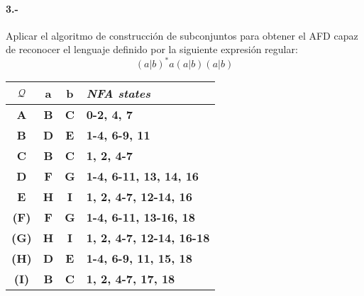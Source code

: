 \documentclass[11pt,a4paper,table,answers]{exam} %
\newcommand{\h}[1]{\ifprintanswers\textcolor{azul}{\bf#1}\else{\phantom{\bf#1}}\fi}
\newlength{\graphicheigth}
\newcommand{\myincludegraphicssol}[1]{%
    \sbox{\graphicbox}{%
        \begin{adjustbox}{max size={\textwidth}{\textheight}}
            \texttt{[image: \#1]}
        \end{adjustbox}
    }
    \settoheight{\graphicheigth}{\usebox{\graphicbox}}
    \addtolength{\graphicheigth}{4ex} %
    \ifprintanswers
        \begin{center}
            \usebox{\graphicbox}
        \end{center} 
    \else
        \makeemptybox{\graphicheigth}
    \fi
}
\begin{document}
\paragraph{3.-}\label{p3}
Aplicar el algoritmo de construcción de subconjuntos para obtener el AFD capaz de reconocer el lenguaje definido por la siguiente expresión regular:
\[
    (a|b)^*a(a|b)(a|b)
\]
\myincludegraphicssol{}
\begin{tabular} {c@{\hspace{4mm}}cc@{\hspace{4mm}}l}
\toprule %
$\mathcal{Q}$ & a & b & \emph{NFA states}\\
\midrule %
\h{A} & \h{B} & \h{C} & \h{0-2, 4, 7}\\
\h{B} & \h{D} & \h{E} & \h{1-4, 6-9, 11}\\
\h{C} & \h{B} & \h{C} & \h{1, 2, 4-7}\\
\h{D} & \h{F} & \h{G} & \h{1-4, 6-11, 13, 14, 16}\\
\h{E} & \h{H} & \h{I} & \h{1, 2, 4-7, 12-14, 16}\\
\h{(F)} & \h{F} & \h{G} & \h{1-4, 6-11, 13-16, 18}\\
\h{(G)} & \h{H} & \h{I} & \h{1, 2, 4-7, 12-14, 16-18}\\
\h{(H)} & \h{D} & \h{E} & \h{1-4, 6-9, 11, 15, 18}\\
\h{(I)} & \h{B} & \h{C} & \h{1, 2, 4-7, 17, 18}\\
\bottomrule %
\end{tabular}
\end{document}
